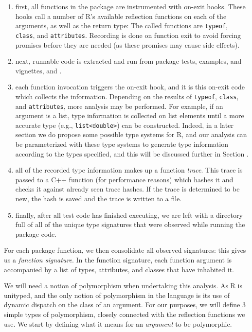\documentclass[acmsmall,10pt,review,anonymous]{acmart}\settopmatter{printfolios=true,printccs=false,printacmref=false}
\begin{document}
\begin{enumerate}
	\item first, all functions in the package are instrumented with on-exit hooks.
  	These hooks call a number of R's available reflection functions on each of the arguments, as well as the return type: 
  	The called functions are {\tt typeof}, {\tt class}, and {\tt attributes}.  
  	Recording is done on function exit to avoid forcing promises before they are needed (as these promises may cause side effects).
  
  	\item next, runnable code is extracted and run from package tests, examples, and vignettes, and .
  
	\item each function invocation triggers the on-exit hook, and it is this on-exit code which collects the information.
	Depending on the results of {\tt typeof}, {\tt class}, and {\tt attributes}, more analysis may be performed.
	For example, if an argument is a list, type information is collected on list elements until a more accurate type (e.g., {\tt list<double>}) can be constructed.
	Indeed, in a later section we do propose some possible type systems for R, and our analysis can be parameterized with these type systems to generate type information according to the types specified, and this will be discussed further in Section .
	
	\item all of the recorded type information makes up a function {\it trace}.
	This trace is passed to a C++ function (for performance reasons) which hashes it and checks it against already seen trace hashes.
	If the trace is determined to be new, the hash is saved and the trace is written to a file.
	
	\item finally, after all test code has finished executing, we are left with a directory full of all of the unique type signatures that were observed while running the package code.
	
\end{enumerate}

For each package function, we then consolidate all observed signatures: this gives us a {\it function signature}.
In the function signature, each function argument is accompanied by a list of types, attributes, and classes that have inhabited it. 

We will need a notion of polymorphism when undertaking this analysis.
As R is unityped, and the only notion of polymorphism in the language is its use of dynamic dispatch on the class of an argument.
For our purposes, we will define 3 simple types of polymorphism, closely connected with the reflection functions we use.
We start by defining what it means for an {\it argument} to be polymorphic.
\end{document}
